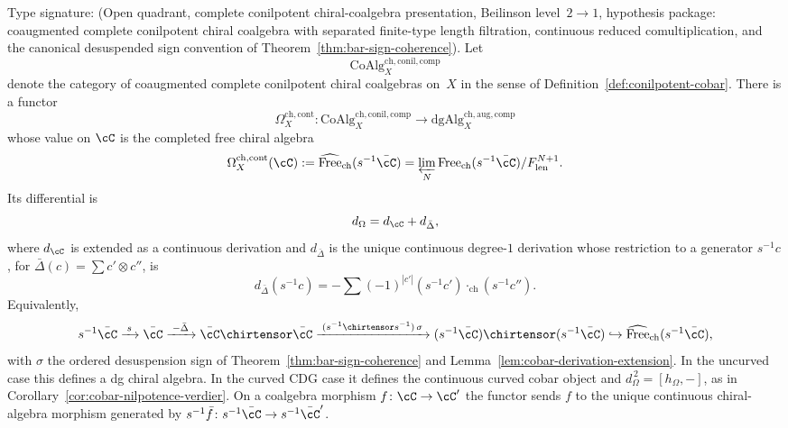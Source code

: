 \begin{theorem}
\label{thm:complete-conilpotent-cobar-functor}
Type signature: \textup{(}Open quadrant, complete conilpotent
chiral-coalgebra presentation, Beilinson level~$2\to1$, hypothesis
package: coaugmented complete conilpotent chiral coalgebra with
separated finite-type length filtration, continuous reduced
comultiplication, and the canonical desuspended sign convention of
Theorem~\ref{thm:bar-sign-coherence}\textup{)}.
Let
\[
\mathrm{CoAlg}^{\mathrm{ch,conil,comp}}_X
\]
denote the category of coaugmented complete conilpotent chiral
coalgebras on~$X$ in the sense of
Definition~\ref{def:conilpotent-cobar}. There is a functor
\[
\Omega^{\mathrm{ch,cont}}_X\colon
\mathrm{CoAlg}^{\mathrm{ch,conil,comp}}_X
\longrightarrow
\mathrm{dgAlg}^{\mathrm{ch,aug,comp}}_X
\]
whose value on $\cC$ is the completed free chiral algebra
\[
\Omega^{\mathrm{ch,cont}}_X(\cC)
 :=
 \widehat{\mathrm{Free}}_{\mathrm{ch}}(s^{-1}\bar{\cC})
 =
 \varprojlim_N
 \mathrm{Free}_{\mathrm{ch}}(s^{-1}\bar{\cC})/
 F^{N+1}_{\mathrm{len}} .
\]
Its differential is
\[
d_\Omega=d_{\cC}+d_{\bar\Delta},
\]
where $d_{\cC}$ is extended as a continuous derivation and
$d_{\bar\Delta}$ is the unique continuous degree-$1$ derivation whose
restriction to a generator $s^{-1}c$, for
$\bar\Delta(c)=\sum c'\otimes c''$, is
\[
d_{\bar\Delta}(s^{-1}c)
 =
 -\sum (-1)^{|c'|}
 (s^{-1}c')\cdot_{\mathrm{ch}}(s^{-1}c'').
\]
Equivalently,
\[
s^{-1}\bar{\cC}
 \xrightarrow{\;s\;} \bar{\cC}
 \xrightarrow{\;-\bar\Delta\;} \bar{\cC}\chirtensor\bar{\cC}
 \xrightarrow{\;(s^{-1}\chirtensor s^{-1})\,\sigma\;}
 (s^{-1}\bar{\cC})\chirtensor(s^{-1}\bar{\cC})
 \hookrightarrow
 \widehat{\mathrm{Free}}_{\mathrm{ch}}(s^{-1}\bar{\cC}),
\]
with $\sigma$ the ordered desuspension sign of
Theorem~\ref{thm:bar-sign-coherence} and
Lemma~\ref{lem:cobar-derivation-extension}. In the uncurved case this
defines a dg chiral algebra. In the curved CDG case it defines the
continuous curved cobar object and
$d_\Omega^{\,2}=[h_\Omega,-]$, as in
Corollary~\ref{cor:cobar-nilpotence-verdier}.
On a coalgebra morphism $f\colon\cC\to\cC'$ the functor sends
$f$ to the unique continuous chiral-algebra morphism generated by
$s^{-1}\bar f\colon s^{-1}\bar\cC\to s^{-1}\bar\cC'$.
\end{theorem}

